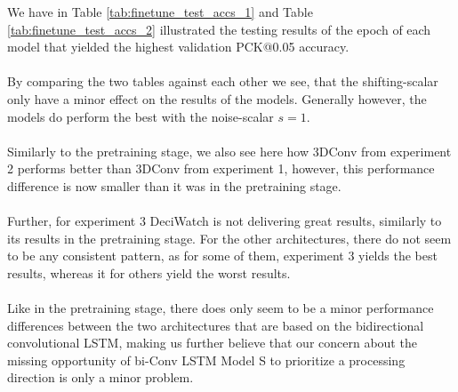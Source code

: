 \documentclass[./main.tex]{subfiles}
\begin{document}
\noindent We have in Table \ref{tab:finetune_test_accs_1} and Table \ref{tab:finetune_test_accs_2} illustrated the testing results of the epoch of each model that yielded the highest validation PCK@0.05 accuracy.
\\
\\
By comparing the two tables against each other we see, that the shifting-scalar only have a minor effect on the results of the models. Generally however, the models do perform the best with the noise-scalar $s = 1$.
\\
\\
Similarly to the pretraining stage, we also see here how 3DConv from experiment 2 performs better than 3DConv from experiment 1, however, this performance difference is now smaller than it was in the pretraining stage.
\\
\\
Further, for experiment 3 DeciWatch is not delivering great results, similarly to its results in the pretraining stage. For the other architectures, there do not seem to be any consistent pattern, as for some of them, experiment 3 yields the best results, whereas it for others yield the worst results.
\\
\\
Like in the pretraining stage, there does only seem to be a minor performance differences between the two architectures that are based on the bidirectional convolutional LSTM, making us further believe that our concern about the missing opportunity of bi-Conv LSTM Model S to prioritize a processing direction is only a minor problem.
\end{document}

